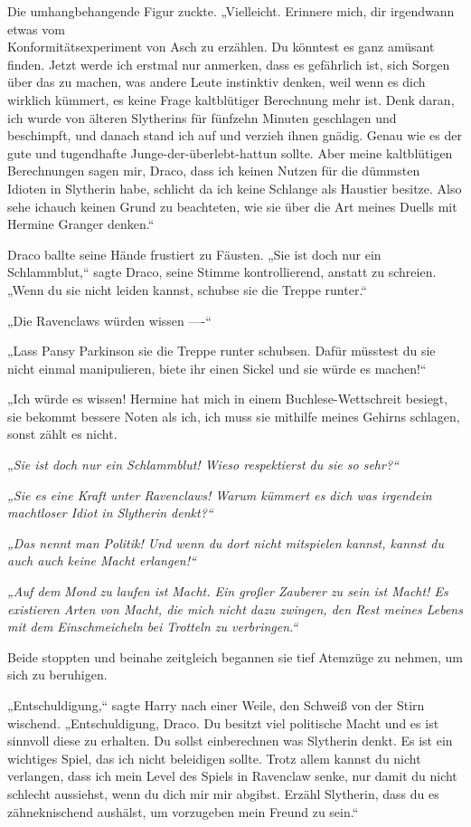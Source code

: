 {Die umhangbehangende Figur zuckte. „Vielleicht. Erinnere mich, dir irgendwann etwas vom\\ Konformitätsexperiment von Asch zu erzählen. Du könntest es ganz amüsant finden. Jetzt werde ich erstmal nur anmerken, dass es gefährlich ist, sich Sorgen über das zu machen, was andere Leute instinktiv denken, weil wenn es dich wirklich kümmert, es keine Frage kaltblütiger Berechnung mehr ist. Denk daran, ich wurde von älteren Slytherins für fünfzehn Minuten geschlagen und beschimpft, und danach stand ich auf und verzieh ihnen gnädig. Genau wie es der gute und tugendhafte Junge-der-überlebt-hattun sollte. Aber meine kaltblütigen Berechnungen sagen mir, Draco, dass ich keinen Nutzen für die dümmsten Idioten in Slytherin habe, schlicht da ich keine Schlange als Haustier besitze. Also sehe ichauch keinen Grund zu beachteten, wie sie über die Art meines Duells mit Hermine Granger denken.“

Draco ballte seine Hände frustiert zu Fäusten. „Sie ist doch nur ein Schlammblut,“ sagte Draco, seine Stimme kontrollierend, anstatt zu schreien. „Wenn du sie nicht leiden kannst, schubse sie die Treppe runter.“

„Die Ravenclaws würden wissen ----“

„Lass Pansy Parkinson sie die Treppe runter schubsen. Dafür müsstest du sie nicht einmal manipulieren, biete ihr einen Sickel und sie würde es machen!“

„Ich würde es wissen! Hermine hat mich in einem Buchlese-Wettschreit besiegt, sie bekommt bessere Noten als ich, ich muss sie mithilfe meines Gehirns schlagen, sonst zählt es nicht.

„\emph{Sie ist doch nur ein Schlammblut! Wieso respektierst du sie so sehr?“}

\emph{„Sie es eine Kraft unter Ravenclaws! Warum kümmert es dich was irgendein machtloser Idiot in Slytherin denkt?“}

\emph{„Das nennt man Politik! Und wenn du dort nicht mitspielen kannst, kannst du auch auch keine Macht erlangen!“}

\emph{„Auf dem} \emph{Mond} \emph{zu laufen ist Macht. Ein großer Zauberer zu sein ist Macht! Es existieren Arten von Macht, die mich nicht dazu zwingen, den Rest meines Lebens mit dem} \emph{Einschmeicheln bei Trotteln zu verbringen.“}

Beide stoppten und beinahe zeitgleich begannen sie tief Atemzüge zu nehmen, um sich zu beruhigen.

„Entschuldigung,“ sagte Harry nach einer Weile, den Schweiß von der Stirn wischend. „Entschuldigung, Draco. Du besitzt viel politische Macht und es ist sinnvoll diese zu erhalten. Du sollst einberechnen was Slytherin denkt. Es ist ein wichtiges Spiel, das ich nicht beleidigen sollte. Trotz allem kannst du nicht verlangen, dass ich mein Level des Spiels in Ravenclaw senke, nur damit du nicht schlecht aussiehst, wenn du dich mir mir abgibst. Erzähl Slytherin, dass du es zähneknischend aushälst, um vorzugeben mein Freund zu sein.“

}
